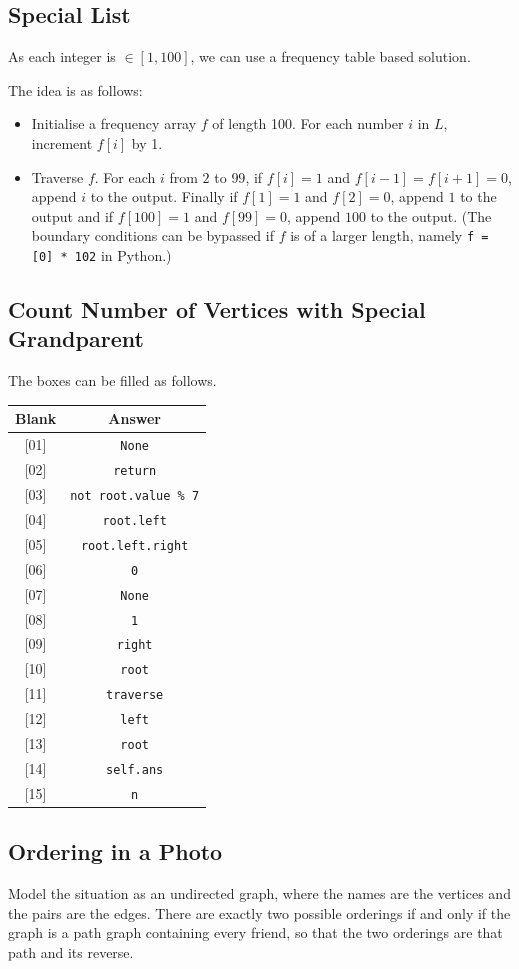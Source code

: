 \documentclass[12pt]{article}
\renewcommand{\t}{\texttt}
\begin{document}
\subsection{Special List}
As each integer is $\in[1, 100]$, we can use a frequency table based solution.

The idea is as follows:
\begin{itemize}
    \item Initialise a frequency array $f$ of length 100. For each number $i$ in $L$, increment $f[i]$ by 1.
    \item Traverse $f$. For each $i$ from $2$ to $99$, if $f[i]=1$ and $f[i-1]=f[i+1]=0$, append $i$ to the output. Finally if $f[1]=1$ and $f[2]=0$, append $1$ to the output and if $f[100]=1$ and $f[99]=0$, append $100$ to the output. (The boundary conditions can be bypassed if $f$ is of a larger length, namely \t{f = [0] * 102} in Python.)
\end{itemize}
\subsection{Count Number of Vertices with Special Grandparent}
The boxes can be filled as follows.
\begin{table}[H]
\centering
\begin{tabular}{|c|c|}
\hline
\textbf{Blank} & \textbf{Answer} \\
\hline
{[01]} & \t{None} \\
{[02]} & \t{return} \\
{[03]} & \t{not root.value \% 7} \\
{[04]} & \t{root.left} \\
{[05]} & \t{root.left.right} \\
{[06]} & \t{0} \\
{[07]} & \t{None} \\
{[08]} & \t{1} \\
{[09]} & \t{right} \\
{[10]} & \t{root} \\
{[11]} & \t{traverse} \\
{[12]} & \t{left} \\
{[13]} & \t{root} \\
{[14]} & \t{self.ans} \\
{[15]} & \t{n} \\
\hline
\end{tabular}
\end{table}
\subsection{Ordering in a Photo}
Model the situation as an undirected graph, where the names are the vertices and the pairs are the edges. There are exactly two possible orderings if and only if the graph is a path graph containing every friend, so that the two orderings are that path and its reverse.
\end{document}
